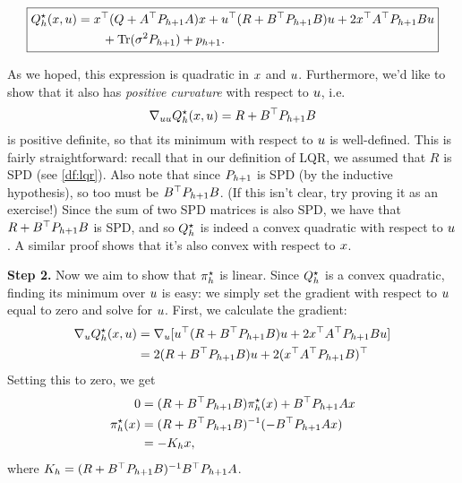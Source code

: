 \documentclass[\main/main]{subfiles}
\begin{document}
\begin{equation}
    \boxed{
        \begin{aligned}
            Q^\star_h(x, u) &= x^\top (Q + A^\top P_{h+1} A) x + u^\top (R + B^\top P_{h+1} B) u
            + 2x^\top A^\top P_{h+1} B u \\
            &\qquad + \operatorname*{\textrm{Tr}}(\sigma^2 P_{h+1}) + p_{h+1}.
        \end{aligned}
    }
    \label{eq:q_star_lqr}
\end{equation}

As we hoped, this expression is quadratic in $x$ and $u$.
Furthermore, we'd like to show that it also has \emph{positive curvature} with respect to $u$, i.e. \[ \nabla_{u u} Q_h^\star(x, u) = R + B^\top P_{h+1} B \] is positive definite, so that its minimum with respect to $u$ is well-defined.
This is fairly straightforward:
recall that in our definition of LQR,
we assumed that $R$ is SPD (see \autoref{df:lqr}).
Also note that since $P_{h+1}$ is SPD (by the inductive hypothesis), so too must be $B^\top P_{h+1} B$. (If this isn't clear, try proving it as an exercise!)
Since the sum of two SPD matrices is also SPD, we have that $R + B^\top P_{h+1} B$ is SPD,
and so $Q^\star_h$ is indeed a convex quadratic with respect to $u$. A similar proof shows that it's also convex with respect to $x$.

\textbf{Step 2.} Now we aim to show that $\pi^\star_h$ is linear.
Since $Q^\star_h$ is a convex quadratic, finding its minimum over $u$ is easy:
we simply set the gradient with respect to $u$ equal to zero and solve for $u$.
First, we calculate the gradient:
\begin{align*}
    \nabla_u Q^\star_h(x, u) &= \nabla_u [ u^\top (R + B^\top P_{h+1} B) u + 2 x^\top A^\top P_{h+1} B u ] \\
    &= 2 (R + B^\top P_{h+1} B) u + 2 (x^\top A^\top P_{h+1} B)^\top
\end{align*}
Setting this to zero, we get \begin{align}
    0 &= (R + B^\top P_{h+1} B) \pi^\star_h(x) + B^\top P_{h+1} A x \nonumber \\
    \pi^\star_h(x) &= (R + B^\top P_{h+1} B)^{-1} (-B^\top P_{h+1} A x) \nonumber \\
    &= - K_h x,
\end{align}
where $K_h = (R + B^\top P_{h+1} B)^{-1} B^\top P_{h+1} A$.
\end{document}
